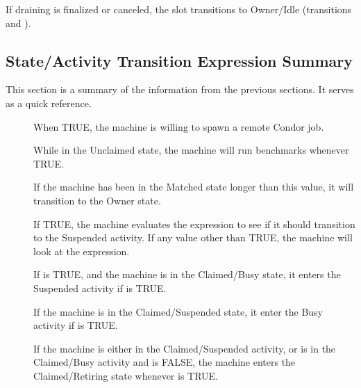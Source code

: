 If draining is finalized or canceled, the slot transitions to
Owner/Idle (transitions  and ).

\subsection{\label{sec:State-Expression-Summary}
State/Activity Transition Expression Summary}
This section is a summary of the information from the
previous sections.
It serves as a quick reference.

\begin{description}
  
\item[] When TRUE, the machine is willing to spawn
  a remote Condor job.
  
\item[] While in the Unclaimed state, the machine
  will run benchmarks whenever TRUE.
  
\item[] If the machine has been in the Matched
  state longer than this value, it will transition to the Owner state.
  
\item[] If TRUE, the machine evaluates
  the  expression to see if it should transition to the
  Suspended activity.  
  If any value other than TRUE, the machine will look at
  the  expression.
  
\item[] If  is TRUE, and the machine
  is in the Claimed/Busy state, it enters the Suspended activity
  if  is TRUE.
  
\item[] If the machine is in the Claimed/Suspended
  state, it enter the Busy activity if  is TRUE.
  
\item[] If the machine is either in the Claimed/Suspended
  activity, or is in the Claimed/Busy activity and
   is FALSE, the machine enters the Claimed/Retiring
  state whenever  is TRUE. 


\end{description}
